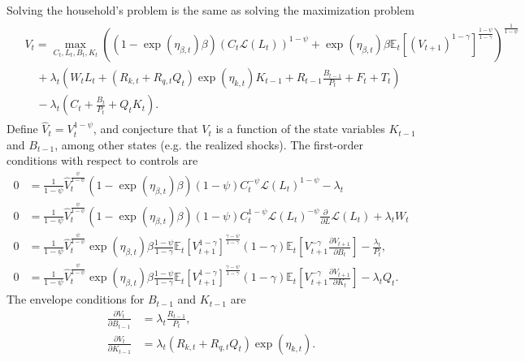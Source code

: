 \documentclass[12 pt, oneside]{article}
\theoremstyle{definition}
\theoremstyle{definition}
\theoremstyle{definition}
\newcommand{\E}{\mathbb{E}}
\newcommand{\calL}{\mathcal{L}}
\begin{document}
Solving the household's problem is the same as solving the maximization problem
\begin{align}
  \begin{split}
  &V_t = \max_{C_t, L_t, B_t, K_t} \left((1 - \exp(\eta_{\beta, t})\beta)\left(C_t \calL(L_t)\right)^{1 - \psi} + \exp(\eta_{\beta, t})\beta \E_t\left[\left(V_{t + 1}\right)^{1 - \gamma}\right]^{\frac{1 - \psi}{1 - \gamma}}\right)^{\frac{1}{1 - \psi}}\\
  & \quad + \lambda_t \left(W_t L_t + (R_{k, t} + R_{q, t}Q_t)\exp(\eta_{k, t})K_{t - 1} + R_{t - 1} \frac{B_{t - 1}}{P_t} + F_t + T_t\right)\\
  &\quad - \lambda_t\left(C_t + \frac{B_t}{P_t} + Q_tK_t\right).
  \end{split}
\end{align}
Define $\hat{V}_t = V_t^{1 - \psi}$, and conjecture that $V_t$ is a function of the state variables $K_{t - 1}$ and $B_{t - 1}$, among other states (e.g. the realized shocks). The first-order conditions with respect to controls are
\begin{align*}
  0 & = \frac{1}{1 - \psi}\hat{V}_t^{\frac{\psi}{1 - \psi}} (1 - \exp(\eta_{\beta, t})\beta) (1 - \psi)C_t^{-\psi} \calL(L_t)^{1 - \psi} - \lambda_t\\
  0 & = \frac{1}{1 - \psi}\hat{V}_t^{\frac{\psi}{1 - \psi}}(1 - \exp(\eta_{\beta, t})\beta)(1 - \psi)C_t^{1 - \psi}\calL(L_t)^{-\psi}\frac{\partial}{\partial L}\calL(L_t) + \lambda_tW_t\\
  0 & = \frac{1}{1 - \psi}\hat{V}_t^{\frac{\psi}{1 - \psi}}\exp(\eta_{\beta, t})\beta \frac{1 - \psi}{1 - \gamma}\E_t[V_{t + 1}^{1 - \gamma}]^{\frac{\gamma - \psi}{1 - \gamma}} (1 - \gamma)\E_t\left[V_{t + 1}^{ - \gamma}\frac{\partial V_{t + 1}}{\partial B_t}\right] - \frac{\lambda_t}{P_t},\\
  0 & = \frac{1}{1 - \psi}\hat{V}_t^{\frac{\psi}{1 - \psi}}\exp(\eta_{\beta, t})\beta \frac{1 - \psi}{1 - \gamma}\E_t[V_{t + 1}^{1 - \gamma}]^{\frac{\gamma - \psi}{1 - \gamma}} (1 - \gamma)\E_t\left[V_{t + 1}^{ - \gamma}\frac{\partial V_{t + 1}}{\partial K_t}\right] - \lambda_t Q_t.
\end{align*}
The envelope conditions for  $B_{t - 1}$ and  $K_{t - 1}$ are
\begin{align*}
  \frac{\partial V_t}{\partial B_{t - 1}} & = \lambda_t\frac{R_{t - 1}}{P_t},\\
  \frac{\partial V_t}{\partial K_{t - 1}} & = \lambda_t(R_{k, t} + R_{q, t}Q_t)\exp(\eta_{k, t}).
\end{align*}
\end{document}
